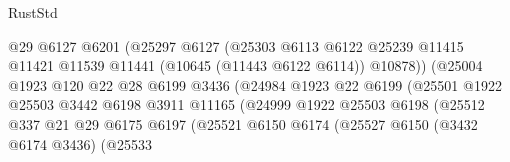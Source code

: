 \begin{lexlean}{RustStd}
\begin{coremodule}
                                        @29
                                        @6127
                                        @6201
                                        (@25297
                                          @6127
                                          (@25303
                                            @6113
                                            @6122
                                            @25239
                                            @11415
                                            @11421
                                            @11539
                                            @11441
                                            (@10645 (@11443 @6122 @6114))
                                            @10878))
                                        (@25004
                                          @1923
                                          @120
                                          @22
                                          @28
                                          @6199
                                          @3436
                                          (@24984
                                            @1923
                                            @22
                                            @6199
                                            (@25501
                                              @1922
                                              @25503
                                              @3442
                                              @6198
                                              @3911
                                              @11165
                                              (@24999
                                                @1922
                                                @25503
                                                @6198
                                                (@25512
                                                  @337
                                                  @21
                                                  @29
                                                  @6175
                                                  @6197
                                                  (@25521
                                                    @6150
                                                    @6174
                                                    (@25527
                                                      @6150
                                                      (@3432 @6174 @3436)
                                                      (@25533

\end{coremodule}
\end{lexlean}
